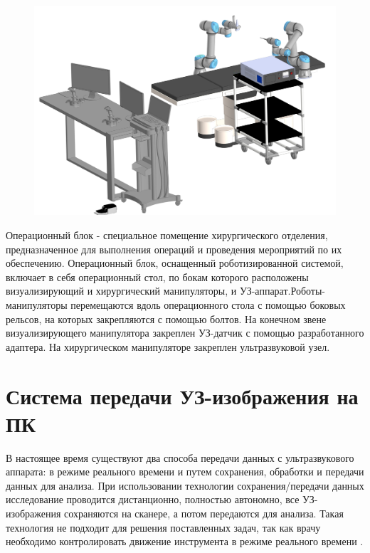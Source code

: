 \begin{figure}[!h]
\begin{center}
\includegraphics[width=\textwidth]{Рисунки/опер.png}
\caption{\centering {}}
\label{част}
\end{center}
\end{figure}

Операционный блок - специальное помещение хирургического отделения, предназначенное для выполнения операций и проведения мероприятий по их обеспечению. Операционный блок, оснащенный роботизированной системой, включает в себя операционный стол, по бокам которого расположены визуализирующий и хирургический манипуляторы, и УЗ-аппарат.Роботы-манипуляторы перемещаются вдоль операционного стола с помощью боковых рельсов, на которых закрепляются с помощью болтов. На конечном звене визуализирующего манипулятора закреплен УЗ-датчик с помощью разработанного адаптера. На хирургическом манипуляторе закреплен ультразвуковой узел.
\section{Система передачи УЗ-изображения на ПК}
В настоящее время существуют два способа передачи данных с ультразвукового аппарата: в режиме реального времени и путем сохранения, обработки и передачи данных для анализа. При использовании технологии сохранения/передачи данных исследование проводится дистанционно, полностью автономно, все УЗ-изображения сохраняются на сканере, а потом передаются для анализа. Такая технология не подходит для решения поставленных задач, так как врачу необходимо контролировать движение инструмента в режиме реального времени \cite{litlink1}.

